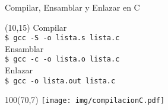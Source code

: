 \documentclass[aspectratio=169]{beamer}
\begin{document}
\begin{frame}[fragile,t]{Compilar, Ensamblar y Enlazar en C}
    \begin{textblock}{60}(10,15)
    \textcolor{naranjauca}{Compilar}\\
    \texttt{\$ gcc -S -o lista.s lista.c}\\
    \bigskip
    \textcolor{naranjauca}{Ensamblar}\\
    \texttt{\$ gcc -c -o lista.o lista.c}\\ %
    \bigskip
    \textcolor{naranjauca}{Enlazar}\\
    \texttt{\$ gcc -o lista.out lista.c}\\
    \end{textblock}
    \begin{textblock}{100}(70,7)
     \texttt{[image: img/compilacionC.pdf]}
    \end{textblock}
\end{frame}

\end{document}
